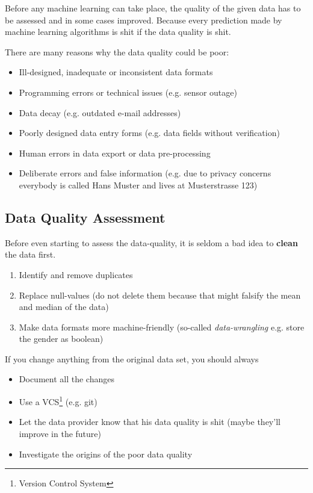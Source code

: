 \documentclass[11pt]{article}
\begin{document}
Before any machine learning can take place, the quality of the given data has to be assessed and in some cases improved. Because every prediction made by machine learning algorithms is shit if the data quality is shit.

There are many reasons why the data quality could be poor:

\begin{itemize}
    \item Ill-designed, inadequate or inconsistent data formats
    \item Programming errors or technical issues (e.g. sensor outage)
    \item Data decay (e.g. outdated e-mail addresses)
    \item Poorly designed data entry forms (e.g. data fields without verification)
    \item Human errors in data export or data pre-processing
    \item Deliberate errors and false information (e.g. due to privacy concerns everybody is called Hans Muster and lives at Musterstrasse 123)
\end{itemize}

\subsection{Data Quality Assessment}

Before even starting to assess the data-quality, it is seldom a bad idea to \textbf{clean} the data first.

\begin{enumerate}
    \item Identify and remove duplicates
    \item Replace null-values (do not delete them because that might falsify the mean and median of the data)
    \item Make data formats more machine-friendly (so-called \textit{data-wrangling} e.g. store the gender as boolean)
\end{enumerate}

\newpage

If you change anything from the original data set, you should always

\begin{itemize}
    \item Document all the changes
    \item Use a VCS\footnote{Version Control System} (e.g. git)
    \item Let the data provider know that his data quality is shit (maybe they'll improve in the future)
    \item Investigate the origins of the poor data quality
\end{itemize}
\end{document}
